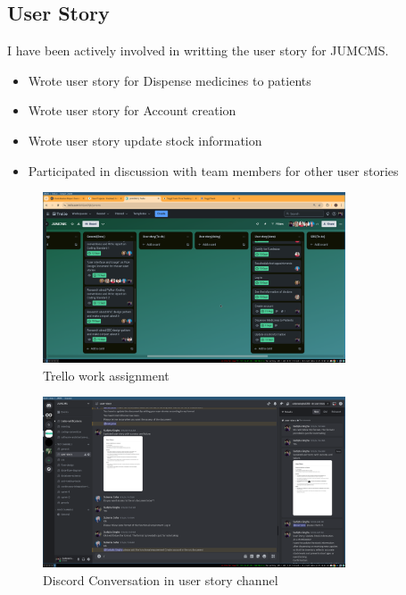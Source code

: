 \documentclass[a4paper,12pt]{article}
\begin{document}
\subsection{User Story}
I have been actively involved in writting the user story for JUMCMS.
\begin{itemize}
    \item Wrote user story for Dispense medicines to patients 
    \item Wrote user story for Account creation
    \item Wrote user story update stock information
    \item Participated in discussion with team members for other user stories
\end{itemize}
\begin{figure}[H]
    \centering
    \includegraphics[width=0.8\textwidth]{images/trello_user_story.png}
    \caption{Trello work assignment}
    \label{fig:trellouserstory}
\end{figure}
\begin{figure}[H]
    \centering
    \includegraphics[width=0.8\textwidth]{images/discord_user_story.png}
    \caption{Discord Conversation in user story channel}
    \label{fig:discorduserstory}
\end{figure}
\end{document}
